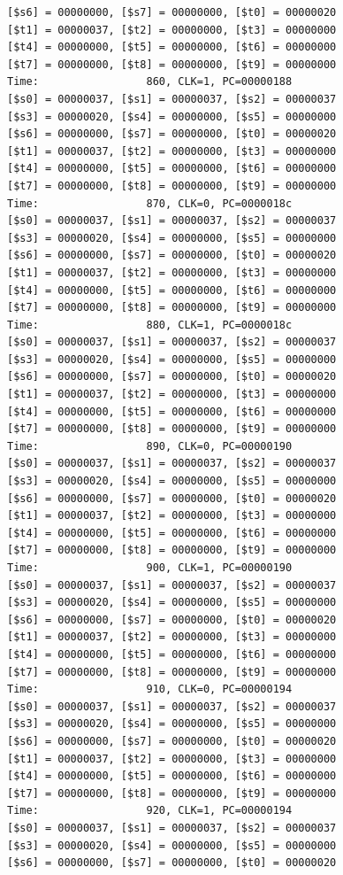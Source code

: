 \documentclass[a4paper,12pt]{article}
\begin{document}
\begin{lstlisting}
[$s6] = 00000000, [$s7] = 00000000, [$t0] = 00000020
[$t1] = 00000037, [$t2] = 00000000, [$t3] = 00000000
[$t4] = 00000000, [$t5] = 00000000, [$t6] = 00000000
[$t7] = 00000000, [$t8] = 00000000, [$t9] = 00000000
Time:                 860, CLK=1, PC=00000188
[$s0] = 00000037, [$s1] = 00000037, [$s2] = 00000037
[$s3] = 00000020, [$s4] = 00000000, [$s5] = 00000000
[$s6] = 00000000, [$s7] = 00000000, [$t0] = 00000020
[$t1] = 00000037, [$t2] = 00000000, [$t3] = 00000000
[$t4] = 00000000, [$t5] = 00000000, [$t6] = 00000000
[$t7] = 00000000, [$t8] = 00000000, [$t9] = 00000000
Time:                 870, CLK=0, PC=0000018c
[$s0] = 00000037, [$s1] = 00000037, [$s2] = 00000037
[$s3] = 00000020, [$s4] = 00000000, [$s5] = 00000000
[$s6] = 00000000, [$s7] = 00000000, [$t0] = 00000020
[$t1] = 00000037, [$t2] = 00000000, [$t3] = 00000000
[$t4] = 00000000, [$t5] = 00000000, [$t6] = 00000000
[$t7] = 00000000, [$t8] = 00000000, [$t9] = 00000000
Time:                 880, CLK=1, PC=0000018c
[$s0] = 00000037, [$s1] = 00000037, [$s2] = 00000037
[$s3] = 00000020, [$s4] = 00000000, [$s5] = 00000000
[$s6] = 00000000, [$s7] = 00000000, [$t0] = 00000020
[$t1] = 00000037, [$t2] = 00000000, [$t3] = 00000000
[$t4] = 00000000, [$t5] = 00000000, [$t6] = 00000000
[$t7] = 00000000, [$t8] = 00000000, [$t9] = 00000000
Time:                 890, CLK=0, PC=00000190
[$s0] = 00000037, [$s1] = 00000037, [$s2] = 00000037
[$s3] = 00000020, [$s4] = 00000000, [$s5] = 00000000
[$s6] = 00000000, [$s7] = 00000000, [$t0] = 00000020
[$t1] = 00000037, [$t2] = 00000000, [$t3] = 00000000
[$t4] = 00000000, [$t5] = 00000000, [$t6] = 00000000
[$t7] = 00000000, [$t8] = 00000000, [$t9] = 00000000
Time:                 900, CLK=1, PC=00000190
[$s0] = 00000037, [$s1] = 00000037, [$s2] = 00000037
[$s3] = 00000020, [$s4] = 00000000, [$s5] = 00000000
[$s6] = 00000000, [$s7] = 00000000, [$t0] = 00000020
[$t1] = 00000037, [$t2] = 00000000, [$t3] = 00000000
[$t4] = 00000000, [$t5] = 00000000, [$t6] = 00000000
[$t7] = 00000000, [$t8] = 00000000, [$t9] = 00000000
Time:                 910, CLK=0, PC=00000194
[$s0] = 00000037, [$s1] = 00000037, [$s2] = 00000037
[$s3] = 00000020, [$s4] = 00000000, [$s5] = 00000000
[$s6] = 00000000, [$s7] = 00000000, [$t0] = 00000020
[$t1] = 00000037, [$t2] = 00000000, [$t3] = 00000000
[$t4] = 00000000, [$t5] = 00000000, [$t6] = 00000000
[$t7] = 00000000, [$t8] = 00000000, [$t9] = 00000000
Time:                 920, CLK=1, PC=00000194
[$s0] = 00000037, [$s1] = 00000037, [$s2] = 00000037
[$s3] = 00000020, [$s4] = 00000000, [$s5] = 00000000
[$s6] = 00000000, [$s7] = 00000000, [$t0] = 00000020

\end{lstlisting}
\end{document}
